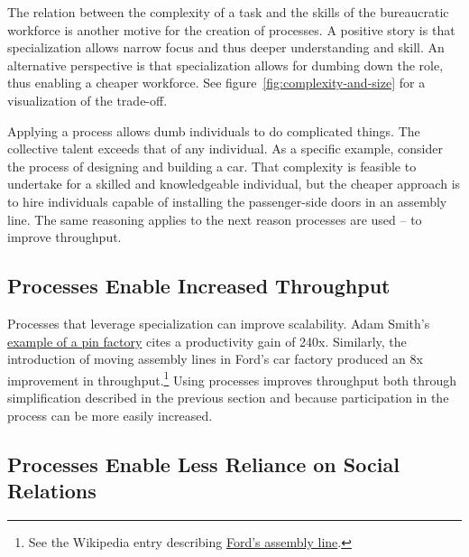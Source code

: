 The relation between the complexity of a task and the skills of the bureaucratic workforce is another motive for the creation of processes.
A positive story is that specialization allows narrow focus and thus deeper understanding and skill. An alternative perspective is that specialization allows for dumbing down the role, thus enabling a cheaper workforce. See figure~\ref{fig:complexity-and-size} \iftoggle{haspagenumbers}{on page~\pageref{fig:complexity-and-size}}{}
for a visualization of the trade-off.

Applying a process allows dumb individuals to do complicated things. The collective talent exceeds that of any individual.  As a specific example, consider the process of designing and building a car. That complexity is feasible to undertake for a skilled and knowledgeable individual, but the cheaper approach is to hire individuals capable of installing the passenger-side doors in an assembly line. The same reasoning applies to the next reason processes are used -- to improve throughput.



\subsection*{Processes Enable Increased Throughput}

Processes that leverage specialization can improve scalability. Adam Smith's \href{https://en.wikipedia.org/wiki/Business_process\%23Adam_Smith}{example of a pin factory} cites a productivity gain of 240x.
Similarly, the introduction of moving assembly lines in Ford's car factory produced an 8x improvement in throughput.\footnote{See the Wikipedia entry describing \href{https://en.wikipedia.org/wiki/Assembly_line\%2320th_century}{Ford's assembly line}.
} Using processes improves throughput both through simplification described in the previous section and because participation in the process can be more easily increased.


\subsection*{Processes Enable Less Reliance on Social Relations}


